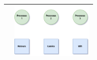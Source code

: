 \documentclass[12pt,a4paper,article,english,firamath]{nsi}
\newcommand{\truc}{4cm}
\begin{document}
\begin{center}
\begin{tabular}{|c|c|}
        \hline
                                                                 & \includegraphics[width=\truc]{img/d6.png}                \\
        \hline
    \end{tabular}
\end{center}
\newpage
\end{document}
